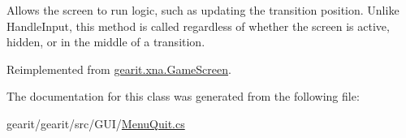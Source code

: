 Allows the screen to run logic, such as updating the transition position. Unlike Handle\+Input, this method is called regardless of whether the screen is active, hidden, or in the middle of a transition. 



Reimplemented from \hyperlink{classgearit_1_1xna_1_1_game_screen_a6bb803502dfbd62b275c2a21d182f88e}{gearit.\+xna.\+Game\+Screen}.



The documentation for this class was generated from the following file\+:\begin{DoxyCompactItemize}
\item 
gearit/gearit/src/\+G\+U\+I/\hyperlink{_menu_quit_8cs}{Menu\+Quit.\+cs}\end{DoxyCompactItemize}

